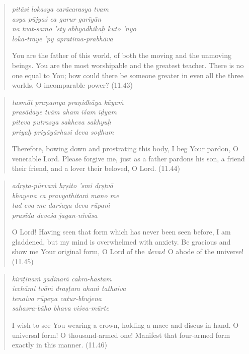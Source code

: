 \documentclass[12pt, twoside, openright]{memoir}
\begin{document}
\par
\begin{verse}
\textit{pitāsi lokasya carācarasya tvam} \\
\textit{asya pūjyaś ca gurur garīyān} \\
\textit{na tvat-samo ’sty abhyadhikaḥ kuto ’nyo} \\
\textit{loka-traye ’py apratima-prabhāva}

\noindent You are the father of this world, of both the moving and the unmoving beings. You are the most worshipable and the greatest teacher. There is no one equal to You; how could there be someone greater in even all the three worlds, O incomparable power? (11.43)
\end{verse}
\par



\par
\begin{verse}
\textit{tasmāt praṇamya praṇidhāya kāyaṁ} \\
\textit{prasādaye tvām aham īśam īḍyam} \\
\textit{piteva putrasya sakheva sakhyuḥ} \\
\textit{priyaḥ priyāyārhasi deva soḍhum}

\noindent Therefore, bowing down and prostrating this body, I beg Your pardon, O venerable Lord. Please forgive me, just as a father pardons his son, a friend their friend, and a lover their beloved, O Lord. (11.44)
\end{verse}
\par



\par
\begin{verse}
\textit{adṛṣṭa-pūrvaṁ hṛṣito ’smi dṛṣṭvā} \\
\textit{bhayena ca pravyathitaṁ mano me} \\
\textit{tad eva me darśaya deva rūpaṁ} \\
\textit{prasīda deveśa jagan-nivāsa}

\noindent O Lord! Having seen that form which has never been seen before, I am gladdened, but my mind is overwhelmed with anxiety. Be gracious and show me Your original form, O Lord of the \textit{devas}! O abode of the universe! (11.45)
\end{verse}
\par



\par
\begin{verse}
\textit{kirīṭinaṁ gadinaṁ cakra-hastam} \\
\textit{icchāmi tvāṁ draṣṭum ahaṁ tathaiva} \\
\textit{tenaiva rūpeṇa catur-bhujena} \\
\textit{sahasra-bāho bhava viśva-mūrte}

\noindent I wish to see You wearing a crown, holding a mace and discus in hand. O universal form! O thousand-armed one! Manifest that four-armed form exactly in this manner. (11.46)
\end{verse}
\par
\end{document}
